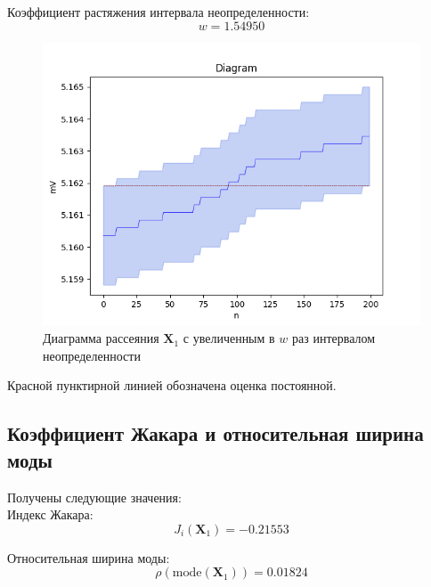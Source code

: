 Коэффициент растяжения интервала неопределенности: 
\begin{equation*}
	w = 1.54950
\end{equation*}

\begin{figure}[H]
	\begin{center}
		\includegraphics[scale = 0.55]{diagram_beta_5.1619115.png}
	\end{center}
	\caption{Диаграмма рассеяния $\bm{X}_1$ с увеличенным в $w$ раз интервалом неопределенности}
\end{figure}

Красной пунктирной линией обозначена оценка постоянной.

\subsection{Коэффициент Жакара и относительная ширина моды}

Получены следующие значения: \\
Индекс Жакара: 
\begin{equation*}
	J_i(\bm{X}_1) = -0.21553
\end{equation*}

Относительная ширина моды: 
\begin{equation*}
	\rho(\text{mode}(\bm{X}_1)) = 0.01824
\end{equation*}
